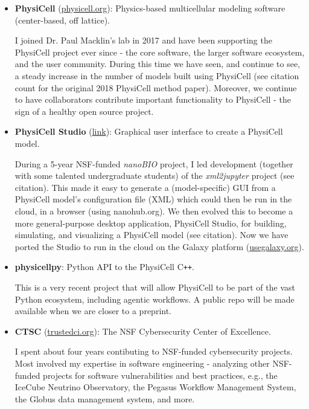 \documentclass[11pt]{article}
\begin{document}
\begin{itemize}[leftmargin=*, itemsep=2pt, topsep=4pt]
    \item \textbf{PhysiCell} (\href{https://physicell.org}{physicell.org}): Physics-based multicellular modeling software (center-based, off lattice).
    
    I joined Dr. Paul Macklin's lab in 2017 and have been supporting the PhysiCell project ever since - the core software, the larger software ecosystem, and the user community. During this time we have seen, and continue to see, a steady increase in the number of models built using PhysiCell (see citation count for the original 2018 PhysiCell method paper). Moreover, we continue to have collaborators contribute important functionality to PhysiCell - the sign of a healthy open source project.
    
    \item \textbf{PhysiCell Studio} (\href{https://github.com/PhysiCell-Tools/PhysiCell-Studio}{link}): Graphical user interface to create a PhysiCell model.

    During a 5-year NSF-funded \textit{nanoBIO} project, I led development (together with some talented undergraduate students) of the \textit{xml2jupyter} project (see citation). This made it easy to generate a (model-specific) GUI from a PhysiCell model's configuration file (XML) which could then be run in the cloud, in a browser (using nanohub.org). We then evolved this to become a more general-purpose desktop application, PhysiCell Studio, for building, simulating, and visualizing a PhysiCell model (see citation). Now we have ported the Studio to run in the cloud on the Galaxy platform (\href{https://usegalaxy.org}{usegalaxy.org}).

    \item \textbf{physicellpy}: Python API to the PhysiCell C\texttt{++}. 
    
    This is a very recent project that will allow PhysiCell to be part of the vast Python ecosystem, including agentic workflows. A public repo will be made available when we are closer to a preprint.

    \item \textbf{CTSC} (\href{https://trustedci.org}{trustedci.org}): The NSF Cybersecurity Center of Excellence.
    
    I spent about four years contibuting to NSF-funded cybersecurity projects. Most involved my expertise in software engineering - analyzing other NSF-funded projects for software vulnerabilities and best practices, e.g., the IceCube Neutrino Observatory, the Pegasus Workflow Management System, the Globus data management system, and more.
    

\end{itemize}
\end{document}
